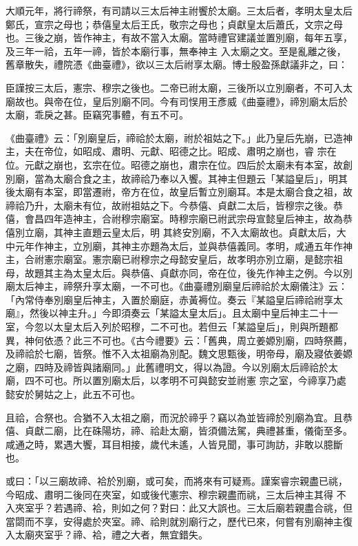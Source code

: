 \begin{pinyinscope}
 大順元年，將行禘祭，有司請以三太后神主祔饗於太廟。三太后者，孝明太皇太后鄭氏，宣宗之母也；恭僖皇太后王氏，敬宗之母也；貞獻皇太后蕭氏，文宗之母也。三後之崩，皆作神主，有故不當入太廟。當時禮官建議並置別廟，每年五享，及三年一祫，五年一禘，皆於本廟行事，無奉神主
 入太廟之文。至是亂離之後，舊章散失，禮院憑《曲臺禮》，欲以三太后祔享太廟。博士殷盈孫獻議非之，曰：



 臣謹按三太后，憲宗、穆宗之後也。二帝已祔太廟，三後所以立別廟者，不可入太廟故也。與帝在位，皇后別廟不同。今有司悮用王彥威《曲臺禮》，禘別廟太后於太廟，乖戾之甚。臣竊究事體，有五不可。



 《曲臺禮》云：「別廟皇后，禘祫於太廟，祔於祖姑之下。」此乃皇后先崩，已造神主，夫在帝位，如昭成、肅明、元獻、昭德之比。昭成、肅明之崩也，睿
 宗在位。元獻之崩也，玄宗在位。昭德之崩也，肅宗在位。四后於太廟未有本室，故創別廟，當為太廟合食之主，故禘祫乃奉以入饗。其神主但題云「某謚皇后」，明其後太廟有本室，即當遷祔，帝方在位，故皇后暫立別廟耳。本是太廟合食之祖，故禘祫乃升，太廟未有位，故祔祖姑之下。今恭僖、貞獻二太后，皆穆宗之後。恭僖，會昌四年造神主，合祔穆宗廟室。時穆宗廟已祔武宗母宣懿皇后神主，故為恭僖別立廟，其神主直題云皇太后，明
 其終安別廟，不入太廟故也。貞獻太后，大中元年作神主，立別廟，其神主亦題為太后，並與恭僖義同。孝明，咸通五年作神主，合祔憲宗廟室。憲宗廟已祔穆宗之母懿安皇后，故孝明亦別立廟，是懿宗祖母，故題其主為太皇太后。與恭僖、貞獻亦同，帝在位，後先作神主之例。今以別廟太后神主，禘祭升享太廟，一不可也。《曲臺禮別廟皇后禘祫於太廟儀注》云：「內常侍奉別廟皇后神主，入置於廟庭，赤黃褥位。奏云『某謚皇后禘祫祔享太
 廟』，然後以神主升。」今即須奏云「某謚太皇太后」。且太廟中皇后神主二十一室，今忽以太皇太后入列於昭穆，二不可也。若但云「某謚皇后」，則與所題都異，神何依憑？此三不可也。《古今禮要》云：「舊典，周立姜嫄別廟，四時祭薦，及禘祫於七廟，皆祭。惟不入太祖廟為別配。魏文思甄後，明帝母，廟及寢依姜嫄之廟，四時及禘皆與諸廟同。」此舊禮明文，得以為證。今以別廟太后禘祫於太廟，四不可也。所以置別廟太后，以孝明不可與懿安並祔憲
 宗之室，今禘享乃處懿安於舅姑之上，此五不可也。



 且祫，合祭也。合猶不入太祖之廟，而況於禘乎？竊以為並皆禘於別廟為宜。且恭僖、貞獻二廟，比在硃陽坊，禘、祫赴太廟，皆須備法駕，典禮甚重，儀衛至多。咸通之時，累遇大饗，耳目相接，歲代未遙，人皆見聞，事可詢訪，非敢以臆斷也。



 或曰：「以三廟故禘、袷於別廟，或可矣，而將來有可疑焉。謹案睿宗親盡已祧，今昭成、肅明二後同在夾室，如或後代憲宗、穆宗親盡而祧，三太后神主其得
 不入夾室乎？若遇禘、袷，則如之何？對曰：此又大誤也。三太后廟若親盡合祧，但當閟而不享，安得處於夾室。禘、祫則就別廟行之，歷代已來，何嘗有別廟神主復入太廟夾室乎？禘、袷，禮之大者，無宜錯失。




\end{pinyinscope}
